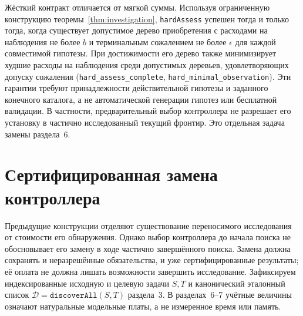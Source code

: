 \documentclass[10pt,a4paper]{article}
\newcommand{\CanonRef}{\mathcal D}
\newcommand{\rc}[1]{\allowbreak\texttt{#1}\allowbreak}
\begin{document}
Жёсткий контракт отличается от мягкой суммы. Используя ограниченную конструкцию теоремы~\ref{thm:investigation}, \rc{hardAssess} успешен тогда и только тогда, когда существует допустимое дерево приобретения с расходами на наблюдения не более $b$ и терминальным сожалением не более $\epsilon$ для каждой совместимой гипотезы. При достижимости его дерево также минимизирует худшие расходы на наблюдения среди допустимых деревьев, удовлетворяющих допуску сожаления (\rc{hard\_assess\_complete}, \rc{hard\_minimal\_observation}). Эти гарантии требуют принадлежности действительной гипотезы и заданного конечного каталога, а не автоматической генерации гипотез или бесплатной валидации. В частности, предварительный выбор контроллера не разрешает его установку в частично исследованный текущий фронтир. Это отдельная задача замены раздела~6.
\clearpage
\section{Сертифицированная замена контроллера}\label{sec:replacement}
Предыдущие конструкции отделяют существование переносимого исследования от стоимости его обнаружения. Однако выбор контроллера до начала поиска не обосновывает его замену в ходе частично завершённого поиска. Замена должна сохранять и неразрешённые обязательства, и уже сертифицированные результаты; её оплата не должна лишать возможности завершить исследование. Зафиксируем индексированные исходную и целевую задачи $S,T$ и канонический эталонный список $\CanonRef=\rc{discoverAll}(S,T)$ раздела~3. В разделах~6--7 учётные величины означают натуральные модельные платы, а не измеренное время или память.
\end{document}
